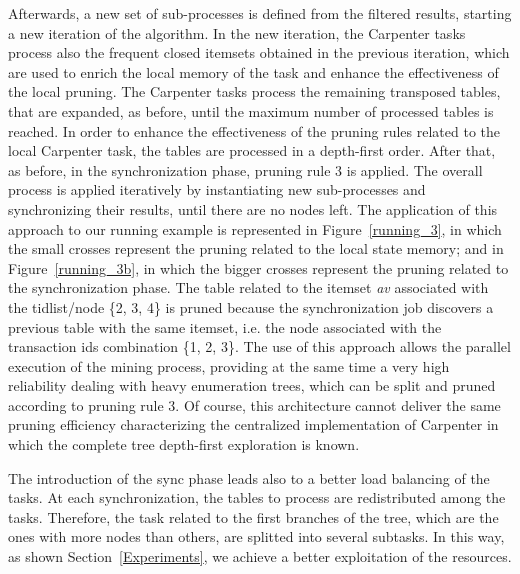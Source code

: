Afterwards, a new set of sub-processes is defined from the filtered results,
starting a new iteration of the algorithm. In the new iteration, the Carpenter
tasks process also the frequent closed itemsets obtained in the previous iteration,
which are used to enrich the local memory of the task and enhance the effectiveness of the local pruning. 
The Carpenter tasks
process the remaining transposed tables, that are expanded, as before, until the
maximum number of processed tables is reached. In order to enhance the
effectiveness of the pruning rules related to the local Carpenter task, the
tables are processed in a depth-first order. After that, as before, in the
synchronization phase, pruning rule 3 is applied.
The overall process is applied iteratively by instantiating new sub-processes
and synchronizing their results,
until there are no nodes left.
The application of this approach to our running example is represented in
Figure~\ref{running_3}, in which the small crosses represent the pruning related to the local
state memory; and in Figure~\ref{running_3b}, in which the bigger crosses represent the pruning related to the synchronization phase.
The table related to the itemset \textit{av}
associated with the tidlist/node \{2, 3, 4\} is pruned because the
synchronization
job discovers a previous table with the same itemset,
i.e.  the node associated with the transaction ids combination \{1, 2, 3\}.
The use of this approach allows the parallel execution of the mining process,
providing at the same time a very high reliability dealing with heavy
enumeration trees, which can be split and pruned according to pruning rule 3.
Of course, this architecture cannot deliver the same pruning efficiency characterizing the centralized implementation of Carpenter in which the complete tree depth-first exploration is known.

The introduction of the sync phase leads also to a better load balancing of the tasks. At each synchronization, the tables to process are redistributed among the tasks. Therefore, the task related to the first branches of the tree, which are the ones with more nodes than others, are splitted into several subtasks. In this way, as shown Section~\ref{Experiments}, we achieve a better exploitation of the resources.


